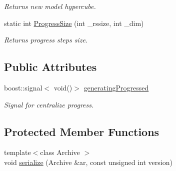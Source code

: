 \begin{DoxyCompactItemize}
\begin{DoxyCompactList}\small\item\em Returns new model hypercube. \end{DoxyCompactList}\item 
static int \hyperlink{class_go_s_u_m_1_1_c_hypercube_ada2117043dce22d1d0caf9f9635d7018}{Progress\-Size} (int \-\_\-rssize, int \-\_\-dim)
\begin{DoxyCompactList}\small\item\em Returns progress steps size. \end{DoxyCompactList}\end{DoxyCompactItemize}
\subsection*{Public Attributes}
\begin{DoxyCompactItemize}
\item 
boost\-::signal$<$ void()$>$ \hyperlink{class_go_s_u_m_1_1_c_hypercube_aae23731c5d5e5faf5881fc7c28542656}{generating\-Progressed}
\begin{DoxyCompactList}\small\item\em Signal for centralize progress. \end{DoxyCompactList}\end{DoxyCompactItemize}
\subsection*{Protected Member Functions}
\begin{DoxyCompactItemize}
\item 
{\footnotesize template$<$class Archive $>$ }\\void \hyperlink{class_go_s_u_m_1_1_c_hypercube_a7303a209b69f0d628b8d2249867e9247}{serialize} (Archive \&ar, const unsigned int version)
\end{DoxyCompactItemize}
